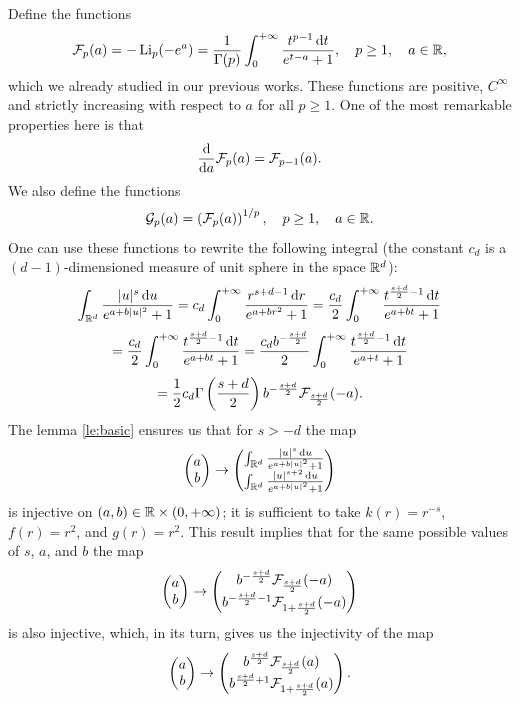 \documentclass{article}
\begin{document}
Define the functions
\begin{equation}
	\mathcal F_p(a) = -\operatorname{Li}_p(-e^{a}) = \frac{1}{\Gamma(p)}\int_{0}^{+\infty}\frac{t^{p-1}{\,\mathrm dt}}{e^{t-a}+1},\quad p\ge1, \quad a\in{\mathbb R},
	\label{eq:def:F}
\end{equation}
which we already studied in our previous works.
These functions are positive, $C^{\infty}$ and strictly increasing with respect to $a$ for all $p\ge1$.
One of the most remarkable properties here is that
\[
	\frac{\mathrm d}{\mathrm da}\mathcal F_p(a)=\mathcal F_{p-1}(a).
\]
We also define the functions
\begin{equation}
	\G_p(a) = \left( \F_p(a) \right)^{1/p},\quad p\ge1, \quad a\in\mbo.
%
	\label{eq:def:G}
\end{equation}
One can use these functions to rewrite the following integral (the constant $c_d$ is a $(d-1)$-dimensioned measure of unit sphere in the space ${\mathbb R^d}$):
\[
	\int_{{\mathbb R^d}}^{}\frac{|u|^s{\,\mathrm du}}{e^{a+b|u|^2}+1} = c_d\int_{0}^{+\infty}\frac{r^{s+d-1}{\,\mathrm dr}}{e^{a+br^2}+1}=\frac{c_d}{2}\int_{0}^{+\infty}\frac{t^{\frac{s+d}{2}-1}{\,\mathrm dt}}{e^{a+bt}+1}
\]
\[
	=\frac{c_d}{2}\int_{0}^{+\infty}\frac{t^{\frac{s+d}{2}-1}{\,\mathrm dt}}{e^{a+bt}+1}
	=\frac{c_db^{-\frac{s+d}{2}}}{2}\int_{0}^{+\infty}\frac{t^{\frac{s+d}{2}-1}{\,\mathrm dt}}{e^{a+t}+1}
\]
\[
	=\frac{1}{2}c_d\Gamma\left( \frac{s+d}{2} \right)b^{-\frac{s+d}{2}}\mathcal F_{\frac{s+d}{2}}(-a).
\]
The lemma \ref{le:basic} ensures us that for $s>-d$ the map
\[
	\begin{pmatrix}
		a\\b
	\end{pmatrix}
	\to 
	\begin{pmatrix}
		\int_{{\mathbb R^d}}^{}\frac{|u|^s{\,\mathrm du}}{e^{a+b|u|^2}+1}\\
		\int_{{\mathbb R^d}}^{}\frac{|u|^{s+2}{\,\mathrm du}}{e^{a+b|u|^2}+1}
	\end{pmatrix}
\]
is injective on $(a,b)\in{\mathbb R}\times(0,+\infty)$; it is sufficient to take $k(r)=r^{-s}$, $f(r)=r^2$, and $g(r)=r^2$. This result implies that for the same possible values of $s$, $a$, and $b$ the map 
\[
	\begin{pmatrix}
		a\\b
	\end{pmatrix}
	\to 
	\begin{pmatrix}
		b^{-\frac{s+d}{2}}\mathcal F_{\frac{s+d}{2}}(-a)\\
		b^{-\frac{s+d}{2}-1}\mathcal F_{1+\frac{s+d}{2}}(-a)
	\end{pmatrix}
\]
is also injective, which, in its turn, gives us the injectivity of the map
\[
	\begin{pmatrix}
		a\\b
	\end{pmatrix}
	\to 
	\begin{pmatrix}
		b^{\frac{s+d}{2}}\mathcal F_{\frac{s+d}{2}}(a)\\
		b^{\frac{s+d}{2}+1}\mathcal F_{1+\frac{s+d}{2}}(a)
	\end{pmatrix}.
\]
\end{document}
